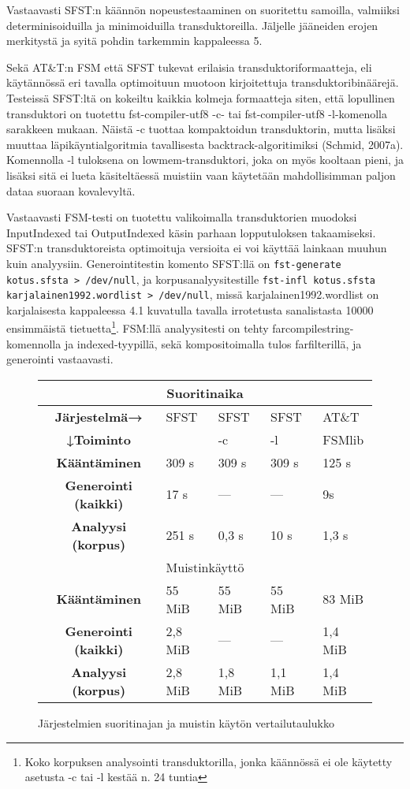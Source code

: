 \documentclass[free]{flammie}
\begin{document}
Vastaavasti SFST:n käännön nopeustestaaminen on suoritettu samoilla, valmiiksi determinisoiduilla ja minimoiduilla transduktoreilla. Jäljelle jääneiden erojen
merkitystä ja syitä pohdin tarkemmin kappaleessa 5.

Sekä AT\&T:n FSM että SFST tukevat erilaisia transduktoriformaatteja, eli käytännössä eri tavalla optimoituun muotoon kirjoitettuja transduktoribinäärejä. Testeissä SFST:ltä on kokeiltu kaikkia kolmeja formaatteja siten, että lopullinen transduktori on tuotettu fst-compiler-utf8 -c- tai fst-compiler-utf8
-l-komenolla sarakkeen mukaan. Näistä -c tuottaa kompaktoidun transduktorin, mutta lisäksi muuttaa läpikäyntialgoritmia tavallisesta backtrack-algoritimiksi
(Schmid, 2007a). Komennolla -l tuloksena on lowmem-transduktori, joka on
myös kooltaan pieni, ja lisäksi sitä ei lueta käsiteltäessä muistiin vaan käytetään
mahdollisimman paljon dataa suoraan kovalevyltä.

Vastaavasti FSM-testi on tuotettu valikoimalla transduktorien muodoksi
InputIndexed tai OutputIndexed käsin parhaan lopputuloksen takaamiseksi. SFST:n
transduktoreista optimoituja versioita ei voi käyttää lainkaan muuhun kuin
analyysiin.  Generointitestin komento SFST:llä on \texttt{fst-generate kotus.sfsta >
/dev/null}, ja korpusanalyysitestille \texttt{fst-infl kotus.sfsta
karjalainen1992.wordlist > /dev/null}, missä karjalainen1992.wordlist on
karjalaisesta kappaleessa 4.1 kuvatulla tavalla irrotetusta sanalistasta 10000
ensimmäistä tietuetta\footnote{Koko korpuksen analysointi transduktorilla, jonka
käännössä ei ole käytetty asetusta -c tai -l kestää n. 24 tuntia}. FSM:llä
analyysitesti on tehty farcompilestring-komennolla ja indexed-tyypillä, sekä
kompositoimalla tulos farfilterillä, ja generointi vastaavasti.

\begin{figure}
    \caption{Järjestelmien suoritinajan ja muistin käytön vertailutaulukko}
    \begin{tabular}{c|l|l|l||l}
        \hline
        \multicolumn{5}{c}{Suoritinaika} \\
        \hline
        \bf Järjestelmä→ & SFST & SFST & SFST & AT\&T \\
        \bf ↓Toiminto & & -c & -l & FSMlib \\
        \hline
        \bf Kääntäminen & 309 s & 309 s & 309 s & 125 s \\
        \hline
        \bf Generointi (kaikki) & 17 s & — & — & 9s \\
        \bf Analyysi (korpus) & 251 s & 0,3 s & 10 s & 1,3 s \\
        \hline
        \multicolumn{5}{c}{Muistinkäyttö} \\
        \hline
        \bf Kääntäminen & 55 MiB & 55 MiB & 55 MiB & 83 MiB \\
        \hline
        \bf Generointi (kaikki) & 2,8 MiB & — & — & 1,4 MiB \\
        \bf Analyysi (korpus) & 2,8 MiB & 1,8 MiB & 1,1 MiB & 1,4 MiB \\
        \hline
    \end{tabular}
\end{figure}
\end{document}
